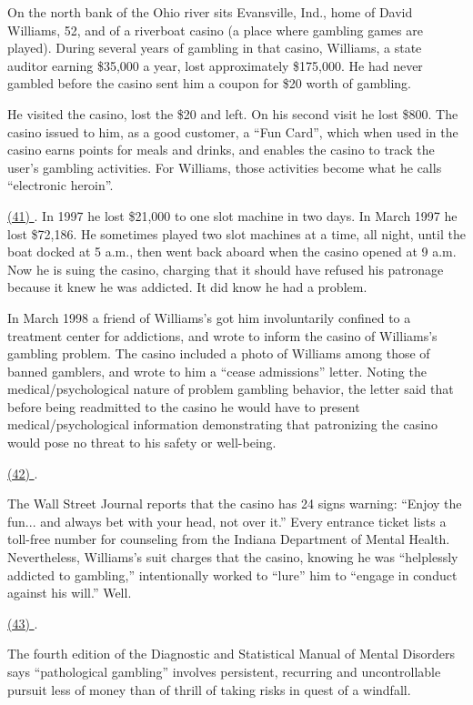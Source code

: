 \qquad On the north bank of the Ohio river sits Evansville, Ind., home of David Williams, 52, and of a riverboat casino (a place where gambling games are played). During several years of gambling in that casino, Williams, a state auditor earning \$35,000 a year, lost approximately \$175,000. He had never gambled before the casino sent him a coupon for \$20 worth of gambling.

\qquad He visited the casino, lost the \$20 and left. On his second visit he lost \$800. The casino issued to him, as a good customer, a ``Fun Card'', which when used in the casino earns points for meals and drinks, and enables the casino to track the user’s gambling activities. For Williams, those activities become what he calls ``electronic heroin''.

\qquad \ul{(41) \qquad\qquad}. In 1997 he lost \$21,000 to one slot machine in two days. In March 1997 he lost \$72,186. He sometimes played two slot machines at a time, all night, until the boat docked at 5 a.m., then went back aboard when the casino opened at 9 a.m. Now he is suing the casino, charging that it should have refused his patronage because it knew he was addicted. It did know he had a problem.

\qquad In March 1998 a friend of Williams’s got him involuntarily confined to a treatment center for addictions, and wrote to inform the casino of Williams’s gambling problem. The casino included a photo of Williams among those of banned gamblers, and wrote to him a “cease admissions” letter. Noting the medical/psychological nature of problem gambling behavior, the letter said that before being readmitted to the casino he would have to present medical/psychological information demonstrating that patronizing the casino would pose no threat to his safety or well-being.

\qquad \ul{(42) \qquad\qquad}.

\qquad The Wall Street Journal reports that the casino has 24 signs warning: “Enjoy the fun... and always bet with your head, not over it.” Every entrance ticket lists a toll-free number for counseling from the Indiana Department of Mental Health. Nevertheless, Williams’s suit charges that the casino, knowing he was “helplessly addicted to gambling,” intentionally worked to “lure” him to “engage in conduct against his will.” Well.

\qquad \ul{(43) \qquad\qquad}.

\qquad The fourth edition of the Diagnostic and Statistical Manual of Mental Disorders says “pathological gambling” involves persistent, recurring and uncontrollable pursuit less of money than of thrill of taking risks in quest of a windfall.

